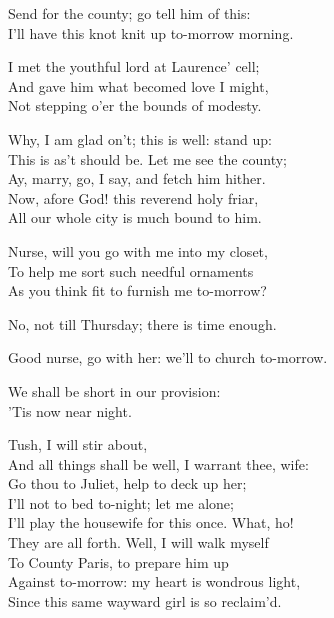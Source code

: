 \begin{speech}
Send for the county; go tell him of this: \\
I'll have this knot knit up to-morrow morning. \\
\end{speech}
\begin{speech}
I met the youthful lord at Laurence' cell; \\
And gave him what becomed love I might, \\
Not stepping o'er the bounds of modesty. \\
\end{speech}
\begin{speech}
Why, I am glad on't; this is well: stand up: \\
This is as't should be.   Let me see the county; \\
Ay, marry, go, I say, and fetch him hither. \\
Now, afore God! this reverend holy friar, \\
All our whole city is much bound to him. \\
\end{speech}
\begin{speech}
Nurse, will you go with me into my closet, \\
To help me sort such needful ornaments \\
As you think fit to furnish me to-morrow? \\
\end{speech}
\begin{speech}
No, not till Thursday; there is time enough. \\

\end{speech}
\begin{speech}
Good nurse, go with her: we'll to church to-morrow.
 \\
\end{speech}
\begin{speech}
We shall be short in our provision: \\
'Tis now near night. \\
\end{speech}
\begin{speech}
Tush, I will stir about, \\
And all things shall be well, I warrant thee, wife: \\
Go thou to Juliet, help to deck up her; \\
I'll not to bed to-night; let me alone; \\
I'll play the housewife for this once. What, ho! \\
They are all forth. Well, I will walk myself \\
To County Paris, to prepare him up \\
Against to-morrow: my heart is wondrous light, \\
Since this same wayward girl is so reclaim'd. \\
\end{speech}



